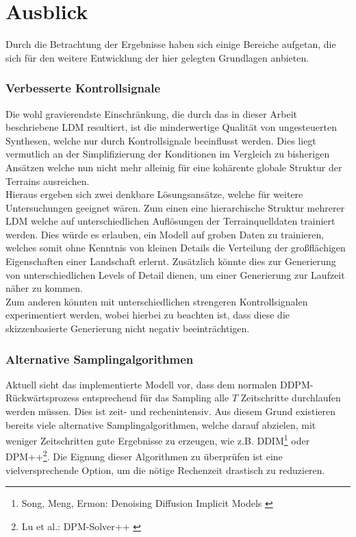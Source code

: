 \section{Ausblick}

Durch die Betrachtung der Ergebnisse haben sich einige Bereiche aufgetan, die sich für den weitere Entwicklung der hier gelegten Grundlagen anbieten.  

\subsubsection{Verbesserte Kontrollsignale}

Die wohl gravierendste Einschränkung, die durch das in dieser Arbeit beschriebene \ac{LDM} resultiert, ist die minderwertige Qualität von ungesteuerten Synthesen, welche nur durch Kontrollsignale beeinflusst werden. Dies liegt vermutlich an der Simplifizierung der Konditionen im Vergleich zu bisherigen Ansätzen welche nun nicht mehr alleinig für eine kohärente globale Struktur der Terrains ausreichen. \\
Hieraus ergeben sich zwei denkbare Lösungsansätze, welche für weitere Untersuchungen geeignet wären. Zum einen eine hierarchische Struktur mehrerer \ac{LDM} welche auf unterschiedlichen Auflösungen der Terrainquelldaten trainiert werden. Dies würde es erlauben, ein Modell auf groben Daten zu trainieren, welches somit ohne Kenntnis von kleinen Details die Verteilung der großflächigen Eigenschaften einer Landschaft erlernt. Zusätzlich könnte dies zur Generierung von unterschiedlichen Levels of Detail dienen, um einer Generierung zur Laufzeit näher zu kommen.\\
Zum anderen könnten mit unterschiedlichen strengeren Kontrollsignalen experimentiert werden, wobei hierbei zu beachten ist, dass diese die skizzenbasierte Generierung nicht negativ beeinträchtigen.  

\subsubsection{Alternative Samplingalgorithmen}

Aktuell sieht das implementierte Modell vor, dass dem normalen DDPM-Rückwärtsprozess entsprechend für das Sampling alle $T$ Zeitschritte durchlaufen werden müssen. Dies ist zeit- und rechenintensiv. Aus diesem Grund existieren bereits viele alternative Samplingalgorithmen, welche darauf abzielen, mit weniger Zeitschritten gute Ergebnisse zu erzeugen, wie z.B. DDIM\footnote{
    Song, Meng, Ermon: Denoising Diffusion Implicit Models
    \cite{song2020denoising}
} oder DPM++\footnote{
    Lu et al.: DPM-Solver++
    \cite{lu2023dpmsolverfastsolverguided}
}. Die Eignung dieser Algorithmen zu überprüfen ist eine vielversprechende Option, um die nötige Rechenzeit drastisch zu reduzieren.

